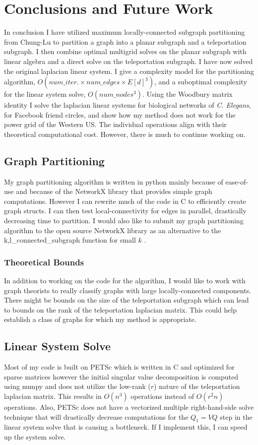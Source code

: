 \documentclass{article}
\begin{document}
\section{Conclusions and Future Work}
In conclusion I have utilized maximum locally-connected subgraph partitioning from Chung-Lu to partition a graph into a planar subgraph and a teleportation subgraph. I then combine optimal multigrid solves on the planar subgraph with linear algebra and a direct solve on the teleportation subgraph. I have now solved the original laplacian linear system. I give a complexity model for the partitioning algorithm, $O(num\_iter. \times num\_edges \times E[d]^3)$, and a suboptimal complexity for the linear system solve, $O(num\_nodes^3)$. Using the Woodbury matrix identity \cite{Woodbury:1950} I solve the laplacian linear systems for biological networks of \textit{C. Elegans}, for Facebook friend circles, and show how my method does not work for the power grid of the Western US. The individual operations align with their theoretical computational cost. However, there is much to continue working on.

\subsection{Graph Partitioning}
My graph partitioning algorithm is written in python mainly because of ease-of-use and because of the NetworkX library that provides simple graph computations. However I can rewrite much of the code in C to efficiently create graph structs. I can then test local-connectivity for edges in parallel, drastically decreasing time to partition. I would also like to submit my graph partitioning algorithm to the open source NetworkX library as an alternative to the k,l\_connected\_subgraph function for small $k$ \cite{Hagberg:2008}.
\subsubsection{Theoretical Bounds}
In addition to working on the code for the algorithm, I would like to work with graph theorists to really classify graphs with large locally-connected components. There might be bounds on the size of the teleportation subgraph which can lead to bounds on the rank of the teleportation laplacian matrix. This could help establish a class of graphs for which my method is appropriate.

\subsection{Linear System Solve}
Most of my code is built on PETSc which is written in C and optimized for sparse matrices \cite{petsc-user-ref} however the initial singular value decomposition is computed using numpy and does not utilize the low-rank ($r$) nature of the teleportation laplacian matrix. This results in $O(n^3)$ operations instead of $O(r^{2}n)$ operations. Also, PETSc does not have a vectorized multiple right-hand-side solve technique that will drastically decrease computations for the $Q_1 = VQ$ step in the linear system solve that is causing a bottleneck. If I implement this, I can speed up the system solve.
\end{document}
